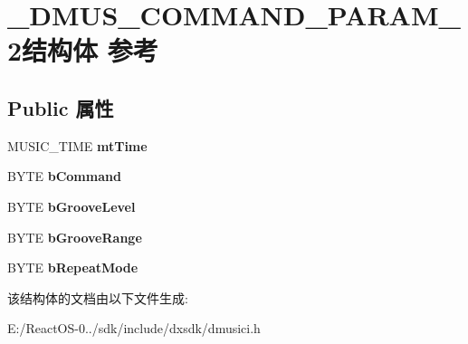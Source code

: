 \hypertarget{struct___d_m_u_s___c_o_m_m_a_n_d___p_a_r_a_m__2}{}\section{\+\_\+\+D\+M\+U\+S\+\_\+\+C\+O\+M\+M\+A\+N\+D\+\_\+\+P\+A\+R\+A\+M\+\_\+2结构体 参考}
\label{struct___d_m_u_s___c_o_m_m_a_n_d___p_a_r_a_m__2}
\subsection*{Public 属性}
\begin{DoxyCompactItemize}
\item 
\mbox{\label{struct___d_m_u_s___c_o_m_m_a_n_d___p_a_r_a_m__2_a798b6dfd1ed45789700689e770df21ce}} 
M\+U\+S\+I\+C\+\_\+\+T\+I\+ME {\bfseries mt\+Time}
\item 
\mbox{\label{struct___d_m_u_s___c_o_m_m_a_n_d___p_a_r_a_m__2_a873ae763859453d5b0b233c024a44d37}} 
B\+Y\+TE {\bfseries b\+Command}
\item 
\mbox{\label{struct___d_m_u_s___c_o_m_m_a_n_d___p_a_r_a_m__2_a2e32efde22150d6345797ec9b4922dea}} 
B\+Y\+TE {\bfseries b\+Groove\+Level}
\item 
\mbox{\label{struct___d_m_u_s___c_o_m_m_a_n_d___p_a_r_a_m__2_a5e78ff59ec9c288776fbf23b61463cc0}} 
B\+Y\+TE {\bfseries b\+Groove\+Range}
\item 
\mbox{\label{struct___d_m_u_s___c_o_m_m_a_n_d___p_a_r_a_m__2_a7408a38837eca4bb00a1e26ce1e62c43}} 
B\+Y\+TE {\bfseries b\+Repeat\+Mode}
\end{DoxyCompactItemize}


该结构体的文档由以下文件生成\+:\begin{DoxyCompactItemize}
\item 
E\+:/\+React\+O\+S-\/0../sdk/include/dxsdk/dmusici.\+h\end{DoxyCompactItemize}
